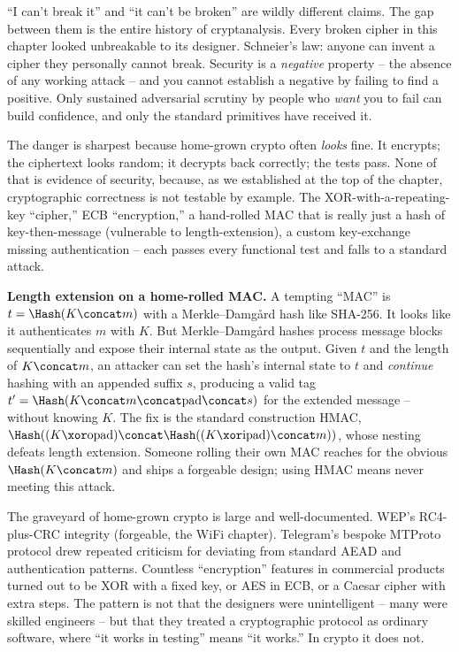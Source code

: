 \begin{intuitionbox}
``I can't break it'' and ``it can't be broken'' are wildly different claims. The gap between them is the entire history of cryptanalysis. Every broken cipher in this chapter looked unbreakable to its designer. Schneier's law: anyone can invent a cipher they personally cannot break. Security is a \emph{negative} property -- the absence of any working attack -- and you cannot establish a negative by failing to find a positive. Only sustained adversarial scrutiny by people who \emph{want} you to fail can build confidence, and only the standard primitives have received it.
\end{intuitionbox}

The danger is sharpest because home-grown crypto often \emph{looks} fine. It encrypts; the ciphertext looks random; it decrypts back correctly; the tests pass. None of that is evidence of security, because, as we established at the top of the chapter, cryptographic correctness is not testable by example. The XOR-with-a-repeating-key ``cipher,'' ECB ``encryption,'' a hand-rolled MAC that is really just a hash of key-then-message (vulnerable to length-extension), a custom key-exchange missing authentication -- each passes every functional test and falls to a standard attack.

\begin{attackbox}
\textbf{Length extension on a home-rolled MAC.} A tempting ``MAC'' is $t = \Hash(K \concat m)$ with a Merkle--Damg{\aa}rd hash like SHA-256. It looks like it authenticates $m$ with $K$. But Merkle--Damg{\aa}rd hashes process message blocks sequentially and expose their internal state as the output. Given $t$ and the length of $K \concat m$, an attacker can set the hash's internal state to $t$ and \emph{continue} hashing with an appended suffix $s$, producing a valid tag $t' = \Hash(K \concat m \concat \text{pad} \concat s)$ for the extended message -- without knowing $K$. The fix is the standard construction HMAC, $\Hash((K \xor \text{opad}) \concat \Hash((K \xor \text{ipad}) \concat m))$, whose nesting defeats length extension. Someone rolling their own MAC reaches for the obvious $\Hash(K\concat m)$ and ships a forgeable design; using HMAC means never meeting this attack.
\end{attackbox}

\begin{historybox}
The graveyard of home-grown crypto is large and well-documented. WEP's RC4-plus-CRC integrity (forgeable, the WiFi chapter). Telegram's bespoke MTProto protocol drew repeated criticism for deviating from standard AEAD and authentication patterns. Countless ``encryption'' features in commercial products turned out to be XOR with a fixed key, or AES in ECB, or a Caesar cipher with extra steps. The pattern is not that the designers were unintelligent -- many were skilled engineers -- but that they treated a cryptographic protocol as ordinary software, where ``it works in testing'' means ``it works.'' In crypto it does not.
\end{historybox}

